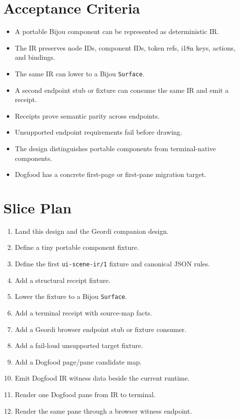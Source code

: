 \section{Acceptance Criteria}\label{record-139-acceptance-criteria}

\begin{itemize}
\tightlist
\item
  A portable Bijou component can be represented as deterministic IR.
\item
  The IR preserves node IDs, component IDs, token refs, i18n keys, actions, and bindings.
\item
  The same IR can lower to a Bijou \texttt{S\allowbreak{}u\allowbreak{}r\allowbreak{}f\allowbreak{}a\allowbreak{}c\allowbreak{}e}.
\item
  A second endpoint stub or fixture can consume the same IR and emit a receipt.
\item
  Receipts prove semantic parity across endpoints.
\item
  Unsupported endpoint requirements fail before drawing.
\item
  The design distinguishes portable components from terminal-native components.
\item
  Dogfood has a concrete first-page or first-pane migration target.
\end{itemize}

\section{Slice Plan}\label{record-139-slice-plan}

\begin{enumerate}
\def\labelenumi{\arabic{enumi}.}
\tightlist
\item
  Land this design and the Geordi companion design.
\item
  Define a tiny portable component fixture.
\item
  Define the first \texttt{u\allowbreak{}i\allowbreak{}-\allowbreak{}s\allowbreak{}c\allowbreak{}e\allowbreak{}n\allowbreak{}e\allowbreak{}-\allowbreak{}i\allowbreak{}r\allowbreak{}/\allowbreak{}1} fixture and canonical JSON rules.
\item
  Add a structural receipt fixture.
\item
  Lower the fixture to a Bijou \texttt{S\allowbreak{}u\allowbreak{}r\allowbreak{}f\allowbreak{}a\allowbreak{}c\allowbreak{}e}.
\item
  Add a terminal receipt with source-map facts.
\item
  Add a Geordi browser endpoint stub or fixture consumer.
\item
  Add a fail-loud unsupported target fixture.
\item
  Add a Dogfood page/pane candidate map.
\item
  Emit Dogfood IR witness data beside the current runtime.
\item
  Render one Dogfood pane from IR to terminal.
\item
  Render the same pane through a browser witness endpoint.
\end{enumerate}

